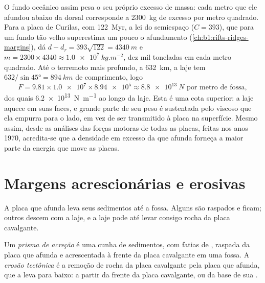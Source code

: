 O fundo oceânico assim pesa o seu próprio excesso de massa: cada metro que ele afundou abaixo da dorsal corresponde a \qty{2300}{kg} de excesso por metro quadrado. Para a placa de Curilas, com \qty{122}{Myr}, a lei do semiespaço ($C = 393$), que para um fundo tão velho superestima um pouco o afundamento (\cref{ch:b1:rifts-ridges-margins}), dá $d - d_r = 393\sqrt{122} = \qty{4340}{m}$ e $m = 2300\times4340 \approx \qty{1.0e7}{kg.m^{-2}}$, dez mil toneladas em cada metro quadrado.
Até o terremoto mais profundo, a \qty{632}{km}, a laje tem $632/\sin\ang{45} = \qty{894}{km}$ de comprimento, logo
\[
  F = 9.81 \times \num{1.0e7} \times \num{8.94e5} \approx \qty{8.8e13}{N}
  \text{ por metro de fossa},
\]
dos quais \qty{6.2e13}{N.m^{-1}} ao longo da laje. Esta é uma cota superior: a laje aquece em suas faces, e grande parte de seu peso é sustentada pelo  viscoso que ela empurra para o lado, em vez de ser transmitido à placa na superfície. Mesmo assim, desde as análises das forças motoras de todas as placas, feitas nos anos 1970, acredita-se que a densidade em excesso da  que afunda forneça a maior parte da energia que move as placas.

\section{Margens acrescionárias e erosivas}\label{sec:b1:active-margins:prisms}

A placa que afunda leva seus sedimentos até a fossa. Alguns são raspados e ficam; outros descem com a laje, e a laje pode até levar consigo rocha da placa cavalgante.

\begin{definition}\label{def:b1:active-margins:accretionary}
Um \emph{prisma de acreção} é uma cunha de sedimentos, com fatias de , raspada da placa que afunda e acrescentada à frente da placa cavalgante em uma fossa. A \emph{erosão tectônica} é a remoção de rocha da placa cavalgante pela placa que afunda, que a leva para baixo: a partir da frente da placa cavalgante, ou da base de sua .
\end{definition}

